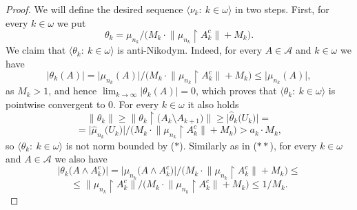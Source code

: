 \documentclass[10pt,a4paper]{amsart}
\newcommand{\N}{\mathbb{N}}
\newcommand{\aA}{\mathcal{A}}
\newcommand{\iA}{\in\aA}
\newcommand{\io}{\in\omega}%
\newcommand{\rstr}{\restriction}
\newcommand{\seqk}[1]{\big\langle#1\colon\ k\io\big\rangle}
\newcommand{\sm}{\setminus}
\newcommand{\wh}{\widehat}
\begin{document}
\begin{proof}
\medskip

We will define the desired sequence $\seqk{\nu_k}$ in two steps. First, for every $k\io$ we put
\[\theta_k=\mu_{n_k}\big/\big(M_k\cdot\big\|\mu_{n_k}\rstr A_k^c\big\|+M_k\big).\]
We claim that $\seqk{\theta_k}$ is anti-Nikodym. Indeed, for every $A\iA$ and $k\io$ we have
\[\big|\theta_k(A)\big|=\big|\mu_{n_k}(A)\big|\big/\big(M_k\cdot\big\|\mu_{n_k}\rstr A_k^c\big\|+M_k\big)\le\big|\mu_{n_k}(A)\big|,\]
as $M_k>1$, and hence $\lim_{k\to\infty}\big|\theta_k(A)\big|=0$,
which proves that $\seqk{\theta_k}$ is pointwise convergent to $0$. For every $k\io$ it also holds
\[\tag{$**$}\big\|\theta_k\big\|\ge\big\|\theta_k\rstr\big(A_k\sm A_{k+1}\big)\big\|\ge\big|\wh{\theta}_k\big(U_k\big)\big|=\]
\[=\big|\wh{\mu}_{n_k}\big(U_k\big)\big|\big/\big(M_k\cdot\big\|\mu_{n_k}\rstr A_k^c\big\|+M_k\big)>a_k\cdot M_k,\]
so $\seqk{\theta_k}$ is not norm bounded by ($*$). Similarly as in ($**$), for every $k\io$ and $A\in\aA$ we also have
\[\tag{$*\!*\!*$}\big|\theta_k\big(A\wedge A_k^c\big)\big|=\big|\mu_{n_k}\big(A\wedge A_k^c\big)\big|\big/\big(M_k\cdot\big\|\mu_{n_k}\rstr A_k^c\big\|+M_k\big)\le\]
\[\le\big\|\mu_{n_k}\rstr A_k^c\big\|\big/\big(M_k\cdot\big\|\mu_{n_k}\rstr A_k^c\big\|+M_k\big)\le1/M_k.\]

\medskip


\end{proof}
\end{document}
